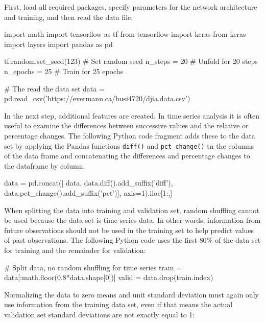 First, load all required packages, specify parameters for the network architecture and training, and then read the data file:

\begin{samepage}
\begin{pythoncode}
import math
import tensorflow as tf
from tensorflow import keras
from keras import layers
import pandas as pd

tf.random.set_seed(123)   # Set random seed
n_steps = 20              # Unfold for 20 steps
n_epochs = 25             # Train for 25 epochs

# The read the data set
data = pd.read_csv('https://evermann.ca/busi4720/djia.data.csv')
\end{pythoncode}
\end{samepage}

In the next step, additional features are created. In time series analysis it is often useful to examine the differences between successive values and the relative or percentage changes. The following Python code fragment adds these to the data set by applying the Pandas functions \texttt{diff()} and \texttt{pct\_change()} tn the columns of the data frame and concatenating the differences and percentage changes to the dataframe by column.

\begin{samepage}
\begin{pythoncode}
data = pd.concat([
    data,
    data.diff().add_suffix('diff'),
    data.pct_change().add_suffix('pct')],
    axis=1).iloc[1:,]
\end{pythoncode}
\end{samepage}

When splitting the data into training and validation set, random shuffling cannot be used because the data set is time series data. In other words, information from future observations should not be used in the training set to help predict values of past observations. The following Python code uses the first $80\%$ of the data set for training and the remainder for validation:

\begin{samepage}
\begin{pythoncode}    
# Split data, no random shuffling for time series
train = data[:math.floor(0.8*data.shape[0])]
valid = data.drop(train.index)
\end{pythoncode}
\end{samepage}

Normalizing the data to zero means and unit standard deviation must again only use information from the training data set, even if that means the actual validation set standard deviations are not exactly equal to 1:

